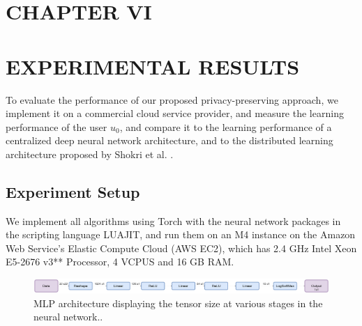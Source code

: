 \documentclass[letterpaper]{article}
\begin{document}
\begin{flushleft}
{%





\pagebreak
\section*{CHAPTER VI}
\vspace{0.25in}
\section{EXPERIMENTAL RESULTS}

To evaluate the performance of our proposed privacy-preserving approach, we implement it on a commercial cloud service provider, and measure the
learning performance of the user $u_0$, and compare it to the learning performance of a centralized deep neural network
architecture, and to the distributed learning architecture proposed by Shokri et al. \cite{shokri2015privacy}.

\subsection{Experiment Setup}
We implement all algorithms using Torch with the neural network packages in the scripting language LUAJIT, and run them on an M4
instance on the Amazon Web Service's Elastic Compute Cloud (AWS EC2), which has
2.4 GHz Intel Xeon E5-2676 v3** Processor, 4 VCPUS and 16 GB RAM.


\begin{figure}[H]
  \centering
    \includegraphics[width=6in]{MLPArchitecture.png}
    \caption[Tensor sizes in a MLP architecture.]{\label{fig:MLPArch} MLP architecture displaying the tensor size at various stages in the neural network..}
  \end{figure}


}
\end{flushleft}
\end{document}
